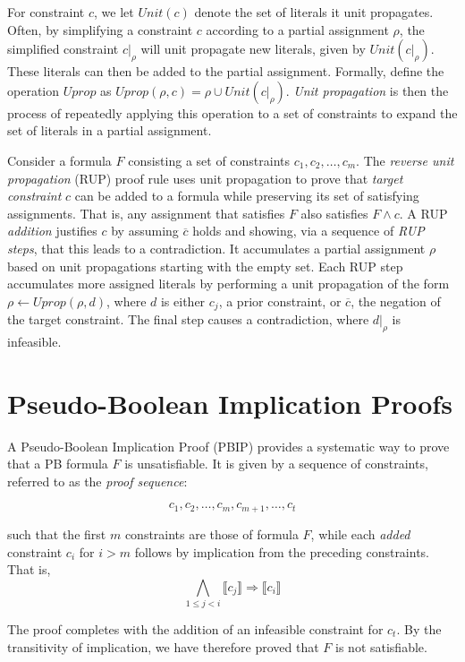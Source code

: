\documentclass{fmcad}
\begin{document}
For constraint $c$, we let $Unit(c)$ denote the set of literals it unit propagates. Often, by
simplifying a constraint $c$ according to a partial assignment $\rho$, the simplified constraint
$c|_\rho$ will unit propagate new literals, given by $Unit(c|_\rho)$. These literals can then be
added to the partial assignment. Formally, define the operation $Uprop$ as
$Uprop(\rho, c) = \rho \cup Unit(c|_\rho)$. \textit{Unit propagation} is then the process of
repeatedly applying this operation to a set of constraints to expand the set of literals in a
partial assignment.

Consider a formula $F$ consisting a set of constraints $c_1, c_2, \dots, c_m$. The \textit{reverse
  unit propagation} (RUP) proof rule \cite{gocht2022certifying} uses unit propagation to prove
that \textit{target constraint} $c$ can be added to a formula while preserving its set of
satisfying assignments. That is, any assignment that satisfies $F$ also satisfies $F \land c$.
A RUP \textit{addition} justifies $c$ by assuming $\overline{c}$ holds and showing, via a sequence
of \textit{RUP steps}, that this leads to a contradiction. It accumulates a partial assignment
$\rho$ based on unit propagations starting with the empty set. Each RUP step accumulates more
assigned literals by performing a unit propagation of the form $\rho \leftarrow Uprop(\rho, d)$,
where $d$ is either $c_j$, a prior constraint, or $\overline{c}$, the negation of the target
constraint. The final step causes a contradiction, where $d|_\rho$ is infeasible.

\section{Pseudo-Boolean Implication Proofs}
A Pseudo-Boolean Implication Proof (PBIP) provides a systematic way to prove that a PB formula $F$
is unsatisfiable. It is given by a sequence of constraints, referred to as the
\textit{proof sequence}:

\[
  c_1, c_2, \dots, c_m, c_{m + 1}, \dots, c_t
\]

such that the first $m$ constraints are those of formula $F$, while each \textit{added} constraint
$c_i$ for $i > m$ follows by implication from the preceding constraints. That is,
\begin{equation}
  \label{eq:clausal-impl}
  \bigwedge_{1 \leq j < i} \llbracket c_j \rrbracket \Rightarrow \llbracket c_i \rrbracket
\end{equation}

The proof completes with the addition of an infeasible constraint for $c_t$. By the transitivity
of implication, we have therefore proved that $F$ is not satisfiable.
\end{document}
